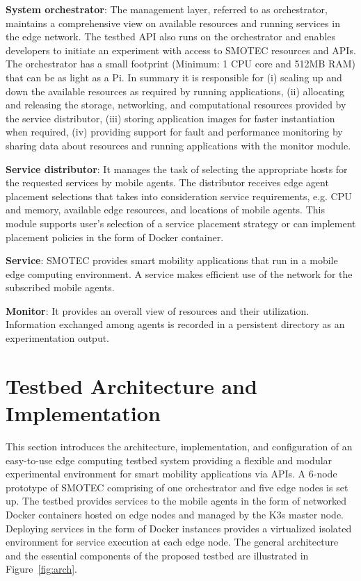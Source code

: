 \documentclass[conference]{IEEEtran}
\begin{document}
\noindent \textbf{System orchestrator}: The management layer, referred to as orchestrator, maintains a comprehensive view on available resources and running services in the edge network. The testbed API also runs on the orchestrator and enables developers to initiate an experiment with access to SMOTEC resources and APIs. The orchestrator has a small footprint (Minimum: 1 CPU core and 512MB RAM) that can be as light as a Pi. In summary it is responsible for (i) scaling up and down the available resources as required by running applications, (ii) allocating and releasing the storage, networking, and computational resources provided by the service distributor, (iii) storing application images for faster instantiation when required, (iv) providing support for fault and performance monitoring by sharing data about resources and running applications with the monitor module.

\noindent \textbf{Service distributor}: It manages the task of selecting the appropriate hosts for the requested services by mobile agents. The distributor receives edge agent placement selections that takes into consideration service requirements, e.g. CPU and memory, available edge resources, and locations of mobile agents. This module supports user's selection of a service placement strategy or can implement placement policies in the form of Docker container.

\noindent \textbf{Service}: SMOTEC provides smart mobility applications that run in a mobile edge computing environment. A service makes efficient use of the network for the subscribed mobile agents.  

\noindent \textbf{Monitor}: It provides an overall view of resources and their utilization. Information exchanged among agents is recorded in a persistent directory as an experimentation output. 

\section{Testbed Architecture and Implementation}\label{sec:implementation}

\par This section introduces the architecture, implementation, and configuration of an easy-to-use edge computing testbed system providing a flexible and modular experimental environment for smart mobility applications via APIs. A 6-node prototype of SMOTEC comprising of one orchestrator and five edge nodes is set up. The testbed provides services to the mobile agents in the form of networked Docker containers hosted on edge nodes and managed by the K3s master node. Deploying services in the form of Docker instances provides a virtualized isolated environment for service execution at each edge node. The general architecture and the essential components of the proposed testbed are illustrated in Figure~\ref{fig:arch}. 
\end{document}
